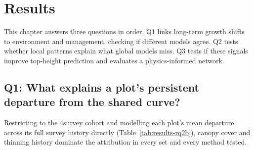 \documentclass[logo,msc,ai]{infthesis}           %
\newcommand{\limit}[1]{\textcolor{cyan}{[LIM: #1]}}
\begin{document}







\chapter{Results} \label{ch:results}
This chapter answers three questions in order. Q1 links long-term growth shifts to environment and management, checking if different models agree. Q2 tests whether local patterns explain what global models miss. Q3 tests if these signals improve top-height prediction and evaluates a physics-informed network.

\section{Q1: What explains a plot's persistent departure from the shared curve?}

Restricting to the 4survey cohort and modelling each plot's mean departure across its
full survey history directly (Table~\ref{tab:results-rq2b}), canopy cover and thinning
history dominate the attribution in every set and every method tested.
\end{document}
